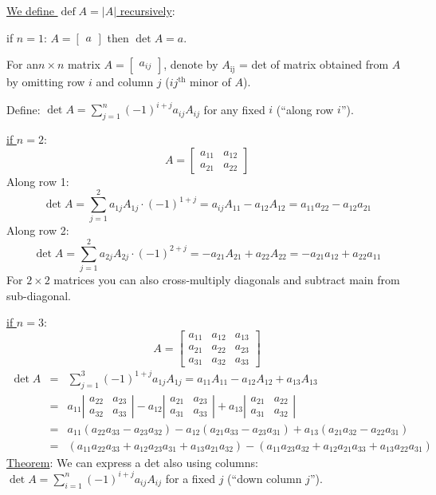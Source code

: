 \documentclass{article}
\newcommand{\nocomma}{}
\newcommand{\tmop}[1]{\ensuremath{\operatorname{#1}}}
\begin{document}
{\underline{We define $\tmop{def} A = | A |$ recursively}}:

if $n = 1$: $A = \left[\begin{array}{c}
  a
\end{array}\right]$ then $\det A = a$.

For an\quad$n \times n$ matrix $A = \left[\begin{array}{c}
  a_{i \nocomma j}
\end{array}\right]$, denote by $A_{\tmop{ij}}$ = det of matrix obtained from
$A$ by omitting row $i$ and column $j$ ($i \nocomma j^{\tmop{th}}$ minor of
$A$).

Define: $\det A = \sum_{j = 1}^n (- 1)^{i + j} a_{i \nocomma j} A_{i \nocomma
j}$ for any fixed $i$ (``along row $i$'').

{\underline{if $n = 2$}}:
\[ A = \left[\begin{array}{cc}
     a_{11} & a_{12}\\
     a_{21} & a_{22}
   \end{array}\right] \]
Along row 1:
\[ \det A = \sum_{j = 1}^2 a_{1 j} A_{1 j} \cdot (- 1)^{1 + j} = a_{i \nocomma
   j} A_{11} - a_{12} A_{12} = a_{11} a_{22} - a_{12} a_{21} \]
Along row 2:
\[ \det A = \sum_{j = 1}^2 a_{2 j} A_{2 j} \cdot (- 1)^{2 + j} = - a_{21}
   A_{21} + a_{22} A_{22} = - a_{21} a_{12} + a_{22} a_{11} \]
For $2 \times 2$ matrices you can also cross-multiply diagonals and subtract
main from sub-diagonal.

{\underline{if $n = 3$}}:
\[ A = \left[\begin{array}{ccc}
     a_{11} & a_{12} & a_{13}\\
     a_{21} & a_{22} & a_{23}\\
     a_{31} & a_{32} & a_{33}
   \end{array}\right] \]
\begin{eqnarray*}
  \det A & = & \sum_{j = 1}^3 (- 1)^{1 + j} a_{1 j} A_{1 j} = a_{11} A_{11} -
  a_{12} A_{12} + a_{13} A_{13}\\
  & = & a_{11}  \left|\begin{array}{cc}
    a_{22} & a_{23}\\
    a_{32} & a_{33}
  \end{array}\right| - a_{12}  \left|\begin{array}{cc}
    a_{21} & a_{23}\\
    a_{31} & a_{33}
  \end{array}\right| + a_{13}  \left|\begin{array}{cc}
    a_{21} & a_{22}\\
    a_{31} & a_{32}
  \end{array}\right|\\
  & = & a_{11}  (a_{22} a_{33} - a_{23} a_{32}) - a_{12}  (a_{21} a_{33} -
  a_{23} a_{31}) + a_{13}  (a_{21} a_{32} - a_{22} a_{31})\\
  & = & (a_{11} a_{22} a_{33} + a_{12} a_{23} a_{31} + a_{13} a_{21} a_{32})
  - (a_{11} a_{23} a_{32} + a_{12} a_{21} a_{33} + a_{13} a_{22} a_{31})
\end{eqnarray*}
{\underline{Theorem}}: We can express a det also using columns: $\det A =
\sum_{i = 1}^n  (- 1)^{i + j} a_{i \nocomma j} A_{i \nocomma j}$ for a fixed
$j$ (``down column $j$'').
\end{document}

